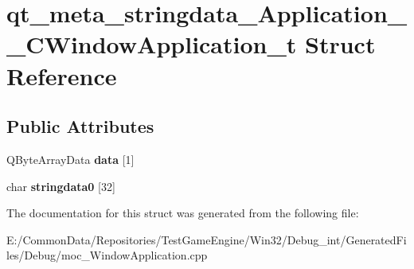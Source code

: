 \hypertarget{structqt__meta__stringdata___application_____c_window_application__t}{}\section{qt\+\_\+meta\+\_\+stringdata\+\_\+\+Application\+\_\+\+\_\+\+C\+Window\+Application\+\_\+t Struct Reference}
\label{structqt__meta__stringdata___application_____c_window_application__t}
\subsection*{Public Attributes}
\begin{DoxyCompactItemize}
\item 
\mbox{\label{structqt__meta__stringdata___application_____c_window_application__t_a305f1a28e98a74196f9061bfb8b62c8f}} 
Q\+Byte\+Array\+Data {\bfseries data} \mbox{[}1\mbox{]}
\item 
\mbox{\label{structqt__meta__stringdata___application_____c_window_application__t_a60d2e928c3abfb32e3f1335e4667b35c}} 
char {\bfseries stringdata0} \mbox{[}32\mbox{]}
\end{DoxyCompactItemize}


The documentation for this struct was generated from the following file\+:\begin{DoxyCompactItemize}
\item 
E\+:/\+Common\+Data/\+Repositories/\+Test\+Game\+Engine/\+Win32/\+Debug\+\_\+int/\+Generated\+Files/\+Debug/moc\+\_\+\+Window\+Application.\+cpp\end{DoxyCompactItemize}
